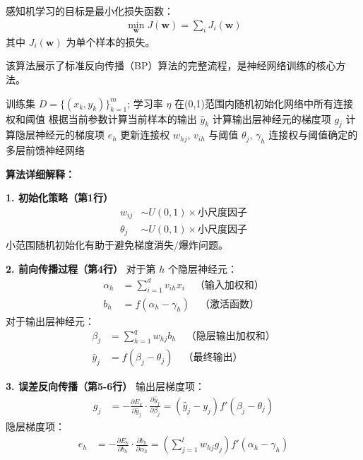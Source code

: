 \begin{definition}[优化目标]
感知机学习的目标是最小化损失函数：
\begin{align}
\min_{\boldsymbol{w}} J(\boldsymbol{w}) = \sum_i J_i(\boldsymbol{w})
\end{align}
其中 $J_i(\boldsymbol{w})$ 为单个样本的损失。
\end{definition}

\begin{example}[多层前馈神经网络的梯度下降算法]
该算法展示了标准反向传播（BP）算法的完整流程，是神经网络训练的核心方法。

\begin{algorithm}
\caption{多层前馈神经网络的梯度下降训练算法}
\begin{algorithmic}[1]
\Require 训练集 $D = \{(x_k, y_k)\}_{k=1}^m$; 学习率 $\eta$
\State 在(0,1)范围内随机初始化网络中所有连接权和阈值
\Repeat
{}
\State 根据当前参数计算当前样本的输出 $\hat{y}_k$ 
\State 计算输出层神经元的梯度项 $g_j$ 
\State 计算隐层神经元的梯度项 $e_h$ 
\State 更新连接权 $w_{hj}$, $v_{ih}$ 与阈值 $\theta_j$, $\gamma_h$ 
\EndFor
{}
\Ensure 连接权与阈值确定的多层前馈神经网络
\end{algorithmic}
\end{algorithm}

\textbf{算法详细解释：}

\textbf{1. 初始化策略（第1行）}
\begin{align}
w_{ij} &\sim U(0,1) \times \text{小尺度因子} \\
\theta_j &\sim U(0,1) \times \text{小尺度因子}
\end{align}
小范围随机初始化有助于避免梯度消失/爆炸问题。

\textbf{2. 前向传播过程（第4行）}
对于第 $h$ 个隐层神经元：
\begin{align}
\alpha_h &= \sum_{i=1}^d v_{ih}x_i \quad \text{（输入加权和）} \\
b_h &= f(\alpha_h - \gamma_h) \quad \text{（激活函数）}
\end{align}
对于输出层神经元：
\begin{align}
\beta_j &= \sum_{h=1}^q w_{hj}b_h \quad \text{（隐层输出加权和）} \\
\hat{y}_j &= f(\beta_j - \theta_j) \quad \text{（最终输出）}
\end{align}

\textbf{3. 误差反向传播（第5-6行）}
输出层梯度项：
\begin{align}
g_j &= -\frac{\partial E_k}{\partial \hat{y}_j} \cdot \frac{\partial \hat{y}_j}{\partial \beta_j} = (\hat{y}_j - y_j)f'(\beta_j - \theta_j)
\end{align}
隐层梯度项：
\begin{align}
e_h &= -\frac{\partial E_k}{\partial b_h} \cdot \frac{\partial b_h}{\partial \alpha_h} = \left(\sum_{j=1}^l w_{hj}g_j\right)f'(\alpha_h - \gamma_h)
\end{align}


\end{example}
